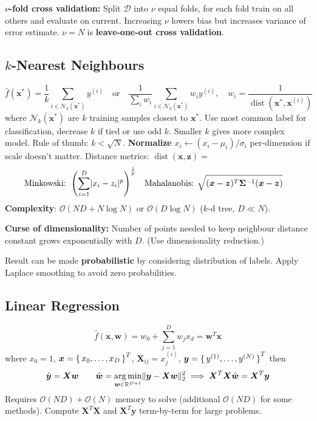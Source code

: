 \documentclass[twocolumn, 8pt]{extarticle}
\begin{document}
\(\nu\)\textbf{-fold cross validation:} Split \(\mathcal D\) into \(\nu\) equal folds, for each fold train on all others
and evaluate on current. Increasing \(\nu\) lowers bias but increases variance of error estimate.
\(\nu = N\) is \textbf{leave-one-out cross validation}.

\subsection{\(k\)-Nearest Neighbours} %

\[
    \hat f(\bm x^*) = \frac{1}{k}\sum _{i \in \mathcal N_k(\bm x^*)} y^{(i)}
    \quad\text{or}\quad
    \frac{1}{\sum _i w_i}\sum _{i \in \mathcal N_k(\bm x^*)} w_iy^{(i)},\quad w_i = \frac{1}{\operatorname{dist}(\bm x^*, \bm x^{(i)})}
\]
where \(\mathcal N_k(\bm x^*)\) are \(k\) training samples closest to \(\bm x^*\). Use most common label for
classification, decrease \(k\) if tied or use odd \(k\). Smaller \(k\) gives more complex model. Rule of thumb: \(k < \sqrt{N}\).
\textbf{Normalize} \(x_i \gets (x_i - \mu _i) / \sigma _i\) per-dimension if scale doesn't matter.
Distance metrics: \(\operatorname{dist}(\bm x, \bm z) =\)
\begin{align*}
    \text{Minkowski: } & \left(\sum _{i = 1}^D \lvert x_i - z_i\rvert^p\right)^\frac{1}{p}
    & \text{Mahalanobis: } & \sqrt{(\bm x - \bm z)^T\bm\Sigma^{-1}(\bm x - \bm z)}
\end{align*}
\textbf{Complexity}: \(\mathcal O(ND + N\log N)\) or \(\mathcal O(D\log N)\) (\(k\)-d tree, \(D \ll N\)).

\textbf{Curse of dimensionality:} Number of points needed to keep neighbour distance constant grows exponentially with
\(D\). (Use dimensionality reduction.)

Result can be made \textbf{probabilistic} by considering distribution of labels. Apply Laplace smoothing to avoid zero
probabilities.

\subsection{Linear Regression} %

\[
    \hat f(\bm x, \bm w) = w_0 + \sum _{j = 1}^D w_jx_d = \bm w^T\bm x
\]
where \(x_0 = 1\), \(\bm x = \set{x_0, \dots, x_D}^T\), \(\bm X_{ij} = x_j^{(i)}\), \(\bm y = \set{y^{(1)}, \dots, y^{(N)}}^T\) then
\[
    \hat{\bm y} = \bm X\bm w \qquad \hat{\bm w} = \operatorname*{arg\,min} _{\bm w \in \mathbb{R}^{D + 1}} \lVert\bm y - \bm X\bm w\rVert_2^2
    \implies \bm X^T\bm X\hat{\bm w} = \bm X^T\bm y
\]
Requires \(\mathcal O(ND) + \mathcal O(N)\) memory to solve (additional \(\mathcal O(ND)\) for some methods). Compute
\(\bm X^T\bm X\) and \(\bm X^T\bm y\) term-by-term for large problems.
\end{document}
